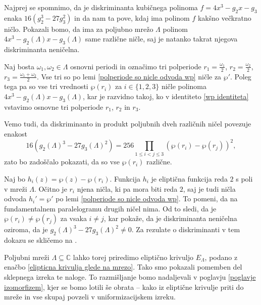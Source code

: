 \documentclass[mat1]{fmfdelo}
\numberwithin{equation}{section}
\newcommand{\C}{\mathbb C}
\newcommand{\om}{\omega}
\theoremstyle{definition}
\begin{document}
\begin{dokaz}
    Najprej se spomnimo, da je diskriminanta kubičnega polinoma $f = 4x^3 - g_2 x - g_3$ enaka $16(g_2^3 - 27g_3^2)$ in da nam ta pove, kdaj ima polinom $f$ kakšno večkratno ničlo. Pokazali bomo, da ima za poljubno mrežo $\Lambda$ polinom $4x^3 - g_2(\Lambda) x - g_3(\Lambda)$ same različne ničle, saj je natanko takrat njegova diskriminanta neničelna.  

    Naj bosta $\om_1, \om_2 \in \Lambda$ osnovni periodi in označimo tri polperiode
    $ r_1 = \frac{\om_1}{2}$, $r_2 = \frac{\om_2}{2}$, $r_3 = \frac{\om_1 + \om_2}{2}$. Vse tri so po lemi \ref{polperiode so nicle odvoda wp} ničle za $\wp'$. Poleg tega pa so vse tri vrednosti $\wp(r_i)$ za $i \in \{1,2,3\}$ ničle polinoma $4x^3 - g_2(\Lambda) x - g_3(\Lambda)$, kar je razvidno takoj, ko v identiteto \eqref{wp identiteta} vstavimo osnovne tri polperiode $r_1$, $r_2$ in $r_3$.
    
    Vemo tudi, da diskriminanto in produkt poljubnih dveh različnih ničel povezuje enakost 
    \[
        16(g_2(\Lambda)^3 - 27g_3(\Lambda)^2) = 256\prod_{1 \leq i < j \leq 3}(\wp(r_i) - \wp(r_j))^2,  
    \]
    zato bo zadoščalo pokazati, da so vse $\wp(r_i)$ različne.
    
    Naj bo $h_i(z) = \wp(z) - \wp(r_i)$. Funkcija $h_i$ je eliptična funkcija reda $2$ s poli v mreži $\Lambda$. Očitno je $r_i$ njena ničla, ki pa mora biti reda $2$, saj je tudi ničla odvoda $h_i' = \wp'$ po lemi \ref{polperiode so nicle odvoda wp}. To pomeni, da na fundamentalnem paralelogramu drugih ničel nima. Od to sledi, da je $\wp(r_i) \neq \wp(r_j)$ za vsaka $i \neq j$, kar pokaže, da je diskriminanta neničelna oziroma, da je $g_2(\Lambda)^3 - 27g_3(\Lambda)^2 \neq 0$. Za rezulate o diskriminanti v tem dokazu se skličemo na \cite{Diskriminanta}.  
\end{dokaz}

Poljubni mreži $\Lambda \subseteq \C$ lahko torej priredimo eliptično krivuljo $E_\Lambda$, podano z enačbo \eqref{elipticna krivulja glede na mrezo}. Tako smo pokazali pomemben del sklepnega izreka te naloge. To razmišljanje bomo nadaljevali v poglavju \ref{poglavje izomorfizem}, kjer se bomo lotili še obrata -- kako iz eliptične krivulje priti do mreže in vse skupaj povzeli v uniformizacijskem izreku.


\end{document}
